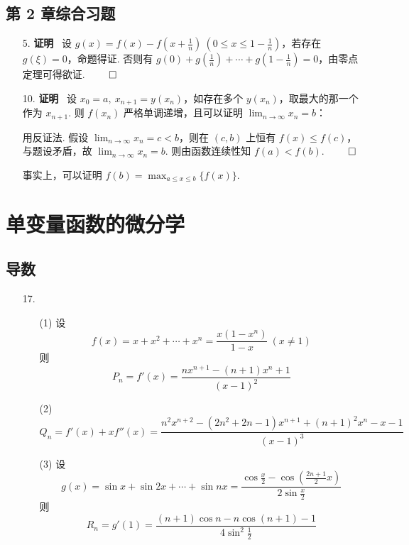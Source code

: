 \documentclass[11pt,oneside,fontset=fandol]{ctexbook} %
\begin{document}
\section*{第 2 章综合习题}

\begin{enumerate}
    \item[5.]
    \textbf{证明} \ 设 $g(x) = f(x) - f(x+\frac 1 n) \ (0 \leqslant x \leqslant 1 - \frac 1 n)$，若存在 $g(\xi) = 0$，命题得证. 否则有 $g(0) + g(\frac 1 n) + \cdots + g(1-\frac 1 n) = 0$，由零点定理可得欲证.
    $\hfill\qed$
    \item[10.]
    \textbf{证明} \ 设 $x_0 = a,\ x_{n+1} = y(x_n)$，如存在多个 $y(x_n)$，取最大的那一个作为 $x_{n+1}$. 则 $f(x_n)$ 严格单调递增，且可以证明 $\lim_{n \to \infty} x_n = b$：
    
    用反证法. 假设 $\lim_{n \to \infty} x_n = c < b$，则在 $(c, b)$ 上恒有 $f(x) \leqslant f(c)$，与题设矛盾，故 $\lim_{n \to \infty} x_n = b$. 则由函数连续性知 $f(a) < f(b)$.
    $\hfill\qed$

    事实上，可以证明 $f(b) = \max_{a \leqslant x \leqslant b}\{ f(x) \}$.
\end{enumerate}

\newpage

\chapter{单变量函数的微分学}

\section{导数}

\begin{enumerate}
    \item[17.]
    \begin{enumerate}
        \item[(1)]
        设
        \[
            f(x) = x + x^2 + \cdots + x^n = \frac{x(1-x^n)}{1-x} \ (x \neq 1)
        \]
        则
        \[
            P_n = f'(x) = \frac{nx^{n+1}-(n+1)x^n+1}{(x-1)^2}
        \]
        \item[(2)]
        \[
            Q_n = f'(x)+xf''(x) = \frac{n^2x^{n+2}-(2n^2+2n-1)x^{n+1}+(n+1)^2x^n-x-1}{(x-1)^3}
        \]
        \item[(3)]
        设
        \[
            g(x) = \sin x + \sin 2x + \cdots + \sin nx = \frac{\cos\frac x 2 - \cos(\frac {2n+1} 2 x)}{2\sin\frac x 2}
        \]
        则
        \[
            R_n = g'(1) = \frac{(n+1)\cos n - n\cos(n+1)-1}{4\sin^2\frac 1 2}
        \]
    \end{enumerate}
\end{enumerate}
\end{document}
